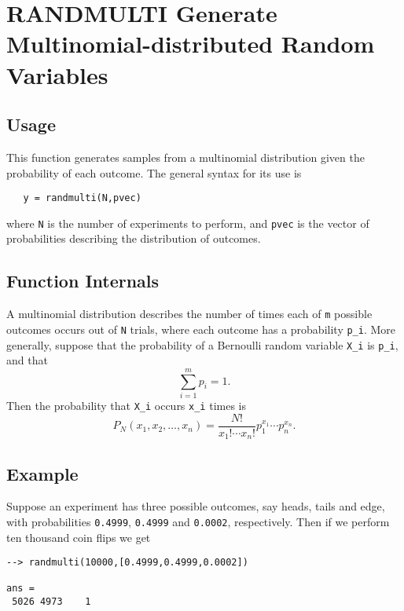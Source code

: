 \section{RANDMULTI Generate Multinomial-distributed Random Variables}

\subsection{Usage}

This function generates samples from a multinomial distribution
given the probability of each outcome.  The general syntax for
its use is
\begin{verbatim}
   y = randmulti(N,pvec)
\end{verbatim}
where \verb|N| is the number of experiments to perform, and \verb|pvec|
is the vector of probabilities describing the distribution of
outcomes.
\subsection{Function Internals}

A multinomial distribution describes the number of times each
of \verb|m| possible outcomes occurs out of \verb|N| trials, where each
outcome has a probability \verb|p_i|.  More generally, suppose that
the probability of a Bernoulli random variable \verb|X_i| is \verb|p_i|,
and that 
\[
   \sum_{i=1}^{m} p_i = 1.
\]
Then the probability that \verb|X_i| occurs \verb|x_i| times is
\[
   P_N(x_1,x_2,\ldots,x_n) = \frac{N!}{x_1!\cdots x_n!} p_1^{x_1}\cdots p_n^{x_n}.
\]
\subsection{Example}

Suppose an experiment has three possible outcomes, say heads,
tails and edge, with probabilities \verb|0.4999|, \verb|0.4999| and
\verb|0.0002|, respectively.  Then if we perform ten thousand coin
flips we get
\begin{verbatim}
--> randmulti(10000,[0.4999,0.4999,0.0002])

ans = 
 5026 4973    1 
\end{verbatim}
